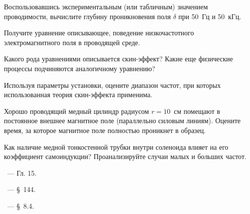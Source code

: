 \begin{lab:questions}
\item Воспользовавшись экспериментальным (или табличным) значением проводимости, 
вычислите глубину проникновения поля $\delta$ при 50~Гц и 50~кГц.

\item Получите уравнение описывающее, поведение низкочастотного электромагнитного 
поля в проводящей среде.

\item Какого рода уравнениями описывается скин-эффект? Какие еще физические
процессы подчиняются аналогичному уравнению?

\item Используя параметры установки, оцените диапазон частот, 
при которых использованная теория скин-эффекта применима.

\item Хорошо проводящий медный цилиндр радиусом $r=10$~см помещают в постоянное внешнее магнитное поле
(параллельно силовым линиям). Оцените время, за которое магнитное поле полностью проникнет в образец.

\item Как наличие медной тонкостенной трубки внутри соленоида влияет 
на его коэффициент самоиндукции?
Проанализируйте случаи малых и больших частот.

%

%
%

\end{lab:questions}


\begin{lab:literature}
\item \Kirichenko~--- Гл. 15.

\item \SivuhinIII~--- \S~144.

\item \KingLokOlh~--- \S~8.4.
\end{lab:literature}
